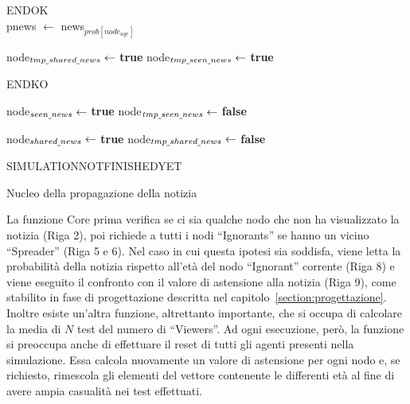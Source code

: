\vspace*{-10pt}
\begin{algorithm}
 \begin{algorithmic}[1]
	\State \Return END\smuscore OK
      \Else 
	  \\
	  
	    \State p\smuscore news $\gets$ news$_{prob[node_{age}]}$
	    
	      \State node$_{tmp\underline{\hspace{1mm}} shared\underline{\hspace{1mm}} news} \gets$ \textbf{true}
	    \EndIf
	    \State node$_{tmp\underline{\hspace{1mm}} seen\underline{\hspace{1mm}} news} \gets$ \textbf{true}
	    
	  \EndIf
	\EndFor
	  \State \Return END\smuscore KO
	\EndIf
	
	  \State node$_{seen\underline{\hspace{1mm}} news} \gets$ \textbf{true}
	  \State node$_{tmp\underline{\hspace{1mm}} seen\underline{\hspace{1mm}} news} \gets$ \textbf{false}
	\EndFor
	
	  \State node$_{shared\underline{\hspace{1mm}} news} \gets$ \textbf{true}
	  \State node$_{tmp\underline{\hspace{1mm}} shared\underline{\hspace{1mm}} news} \gets$ \textbf{false}
	\EndFor
      
	\State \Return SIMULATION\smuscore NOT\smuscore FINISHED\smuscore YET
      \EndIf
    \EndProcedure
 \end{algorithmic}
 
 \caption{Nucleo della propagazione della notizia}
 \label{alg:core_spread}
\end{algorithm}
 \vspace*{-10pt}
La funzione Core prima verifica se ci sia qualche nodo che non ha visualizzato la notizia (Riga 2), 
poi richiede a tutti i nodi ``Ignorants'' se hanno un vicino ``Spreader'' (Riga 5 e 6). 
Nel caso in cui questa ipotesi sia soddisfa, viene letta la probabilità della notizia rispetto all'età del 
nodo ``Ignorant'' corrente (Riga 8) e viene eseguito il confronto con il valore di astensione alla notizia (Riga 9), 
come stabilito in fase di progettazione descritta nel capitolo~\ref{section:progettazione}. 
Inoltre esiste un'altra funzione, altrettanto importante, che si occupa di calcolare la media di $N$ test del numero di ``Viewers''.
Ad ogni esecuzione, però, la funzione si preoccupa anche di effettuare il reset di tutti gli agenti presenti nella simulazione.
Essa calcola nuovamente un valore di astensione per ogni nodo e, se richiesto, rimescola gli elementi del 
vettore contenente le differenti età al fine di avere ampia casualità nei test effettuati.

